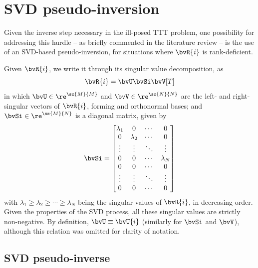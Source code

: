 {\proposed
\section{SVD pseudo-inversion}

Given the inverse step necessary in the ill-posed TTT problem, one possibility for addressing this hurdle -- as briefly commented in the literature review -- is the use of an SVD-based pseudo-inversion, for situations where $\bvR{i}$ is rank-deficient. 

Given $\bvR{i}$, we write it through its singular value decomposition, as
\begin{equation}
	\bvR{i} = \bvU \bvSi \bvV[T]
\end{equation}
in which $\bvU \in \re^{\sz{M}{M}}$ and $\bvV \in \re^{\sz{N}{N}}$ are the left- and right-singular vectors of $\bvR{i}$, forming and orthonormal bases; and $\bvSi \in \re^{\sz{M}{N}}$ is a diagonal matrix, given by
\begin{equation}
	\bvSi = \begin{bmatrix}
		\lambda_1 & 0 & \cdots & 0 \\
		0 & \lambda_2 & \cdots & 0 \\
		\vdots & \vdots & \ddots & \vdots \\
		0 & 0 & \cdots & \lambda_N \\
		0 & 0 & \cdots & 0 \\
		\vdots & \vdots & \ddots & \vdots \\
		0 & 0 & \cdots & 0
	\end{bmatrix}
\end{equation}
with $\lambda_1 \geq \lambda_2 \geq \cdots \geq \lambda_N$ being the singular values of $\bvR{i}$, in decreasing order. Given the properties of the SVD process, all these singular values are strictly non-negative. By definition, $\bvU \equiv \bvU{i}$ (similarly for $\bvSi$ and $\bvV$), although this relation was omitted for clarity of notation.

\subsection{SVD pseudo-inverse}

}
